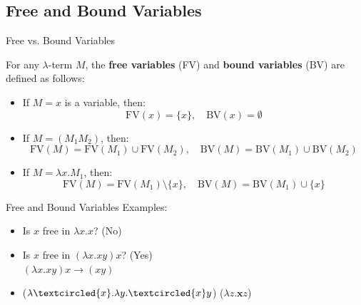\documentclass{beamer}
\begin{document}
\subsection{Free and Bound Variables}
\begin{frame}{Free vs. Bound Variables}

  \begin{definition}
    For any $\lambda$-term \(M\), the \textbf{free variables} (FV) and \textbf{bound variables} (BV) are defined as follows:
    \begin{itemize}
      \item If \(M = x\) is a variable, then:
        \[
        \text{FV}(x) = \{x\}, \quad \text{BV}(x) = \emptyset
        \]
      \item If \(M = (M_1 M_2)\), then:
        \[
        \text{FV}(M) = \text{FV}(M_1) \cup \text{FV}(M_2), \quad \text{BV}(M) = \text{BV}(M_1) \cup \text{BV}(M_2)
        \]
      \item If \(M = \lambda x.M_1\), then:
        \[
        \text{FV}(M) = \text{FV}(M_1) \setminus \{x\}, \quad \text{BV}(M) = \text{BV}(M_1) \cup \{x\}
        \]
    \end{itemize}
  \end{definition}

\end{frame}
\begin{frame}{Free and Bound Variables}
  Examples:
  \begin{itemize}
    \item Is \(x\) free in \(\lambda x.x\)? (No)
    \item Is \(x\) free in \((\lambda x.xy)x\)? (Yes)\\
    \((\lambda x.xy)x \to (xy)\)
  \end{itemize}
  \vspace{1em}
  \begin{itemize}
    \item (\(\lambda \textcircled{x}.\lambda y.\textcircled{x}y\)) (\(\lambda z.\textbf{x}z\))
  \end{itemize}
  
\end{frame}
\end{document}
